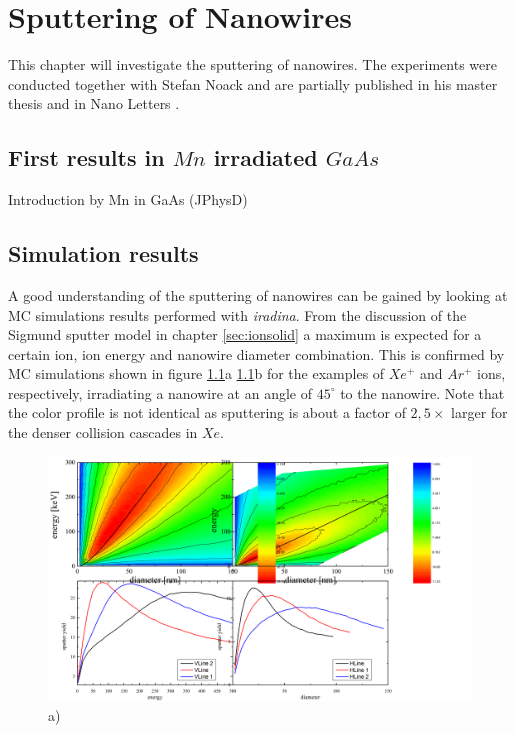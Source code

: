 \chapter{Sputtering of Nanowires}

This chapter will investigate the sputtering of nanowires. The experiments were conducted together with Stefan Noack and are partially published in his master thesis \cite{noack_sputter_2014} and in Nano Letters \cite{}.

\section{First results in $Mn$ irradiated $GaAs$}

Introduction by Mn in GaAs (JPhysD)


\section{Simulation results}
\label{sec:simsputering}

A good understanding of the sputtering of nanowires can be gained by looking at MC simulations results performed with \emph{iradina}. From the discussion of the Sigmund sputter model in chapter \ref{sec:ionsolid} a maximum is expected for a certain ion, ion energy and nanowire diameter combination. This is confirmed by MC simulations shown in figure \ref{sputtering_de}a \ref{sputtering_de}b for the examples of $Xe^+$ and $Ar^+$ ions, respectively, irradiating a nanowire at an angle of $45^\circ$ to the nanowire. Note that the color profile is not identical as sputtering is about a factor of $2,5\times$ larger for the denser collision cascades in $Xe$.

\begin{figure}[th]
	\centering
		\includegraphics[width=.95\textwidth]{images/sputtering_diameter_energy.png}
	\caption{a) } 
	\label{sputtering_de}
\end{figure} 

